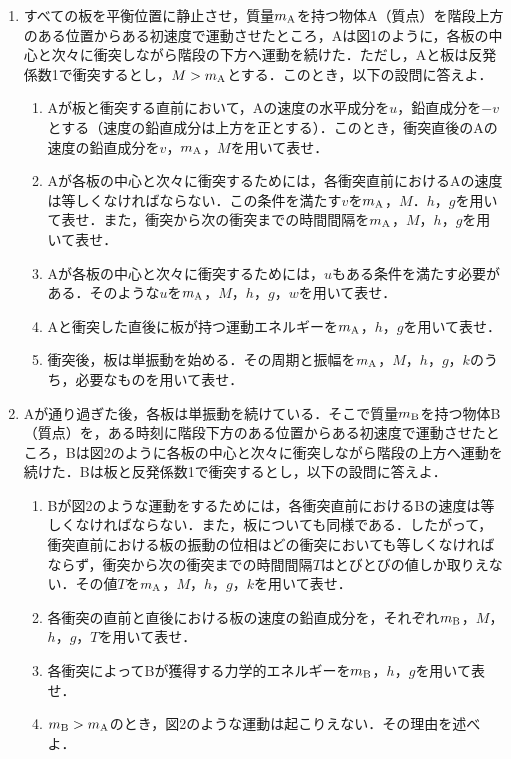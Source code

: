 \begin{enumerate}[I]
  \item {\hzw}すべての板を平衡位置に静止させ，質量$m_\mathrm{A}$を持つ物体A（質点）を階段上方のある位置からある初速度で運動させたところ，Aは図1のように，各板の中心と次々に衝突しながら階段の下方へ運動を続けた．ただし，Aと板は反発係数1で衝突するとし，$M > m_\mathrm{A}$とする．このとき，以下の設問に答えよ．
  \begin{enumerate}[(1)]
    \item {\hzw}Aが板と衝突する直前において，Aの速度の水平成分を$u$，鉛直成分を$-v$とする（速度の鉛直成分は上方を正とする）．このとき，衝突直後のAの速度の鉛直成分を$v$，$m_\mathrm{A}$，$M$を用いて表せ．
    \item {\hzw}Aが各板の中心と次々に衝突するためには，各衝突直前におけるAの速度は等しくなければならない．この条件を満たす$v$を$m_\mathrm{A}$，$M$．$h$，$g$を用いて表せ．また，衝突から次の衝突までの時間間隔を$m_\mathrm{A}$，$M$，$h$，$g$を用いて表せ．
    \item {\hzw}Aが各板の中心と次々に衝突するためには，$u$もある条件を満たす必要がある．そのような$u$を$m_\mathrm{A}$，$M$，$h$，$g$，$w$を用いて表せ．
    \item {\hzw}Aと衝突した直後に板が持つ運動エネルギーを$m_\mathrm{A}$，$h$，$g$を用いて表せ．
    \item {\hzw}衝突後，板は単振動を始める．その周期と振幅を$m_\mathrm{A}$，$M$，$h$，$g$，$k$のうち，必要なものを用いて表せ．
  \end{enumerate}
  \item {\hzw}Aが通り過ぎた後，各板は単振動を続けている．そこで質量$m_\mathrm{B}$を持つ物体B（質点）を，ある時刻に階段下方のある位置からある初速度で運動させたところ，Bは図2のように各板の中心と次々に衝突しながら階段の上方へ運動を続けた．Bは板と反発係数1で衝突するとし，以下の設問に答えよ．
  \begin{enumerate}[(1)]
    \item {\hzw}Bが図2のような運動をするためには，各衝突直前におけるBの速度は等しくなければならない．また，板についても同様である．したがって，衝突直前における板の振動の位相はどの衝突においても等しくなければならず，衝突から次の衝突までの時間間隔$T$はとびとびの値しか取りえない．その値$T$を$m_\mathrm{A}$，$M$，$h$，$g$，$k$を用いて表せ．
    \item {\hzw}各衝突の直前と直後における板の速度の鉛直成分を，それぞれ$m_\mathrm{B}$，$M$，$h$，$g$，$T$を用いて表せ．
    \item {\hzw}各衝突によってBが獲得する力学的エネルギーを$m_\mathrm{B}$，$h$，$g$を用いて表せ．
    \item {\hzw}$m_\mathrm{B} > m_\mathrm{A}$のとき，図2のような運動は起こりえない．その理由を述べよ．
  \end{enumerate}
\end{enumerate}

